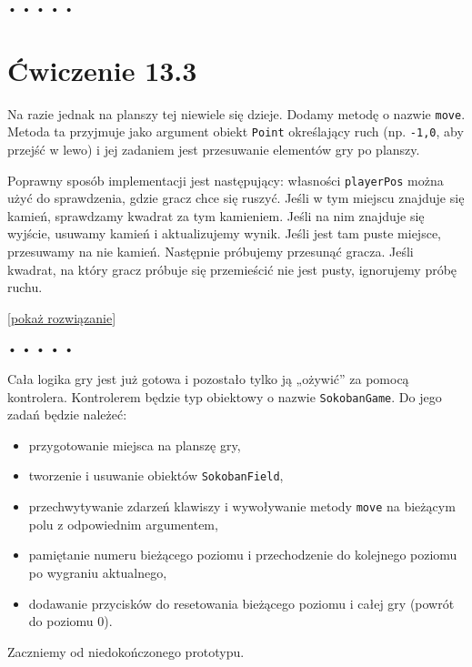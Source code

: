 \begin{center}
• • • • •
\end{center}

  
\section*{Ćwiczenie 13.3}
\label{sec:13.3}
  
    
Na razie jednak na planszy tej niewiele się dzieje. Dodamy metodę o nazwie \texttt{move}. Metoda ta przyjmuje jako argument obiekt \texttt{Point} określający ruch (np. \texttt{-1,0}, aby przejść w lewo) i jej zadaniem jest przesuwanie elementów gry po planszy.

    
Poprawny sposób implementacji jest następujący: własności \texttt{playerPos} można użyć do sprawdzenia, gdzie gracz chce się ruszyć. Jeśli w tym miejscu znajduje się kamień, sprawdzamy kwadrat za tym kamieniem. Jeśli na nim znajduje się wyjście, usuwamy kamień i aktualizujemy wynik. Jeśli jest tam puste miejsce, przesuwamy na nie kamień. Następnie próbujemy przesunąć gracza. Jeśli kwadrat, na który gracz próbuje się przemieścić nie jest pusty, ignorujemy próbę ruchu.

  
[\hyperref[sol:13.3]{pokaż rozwiązanie}]
  


\begin{center}
• • • • •
\end{center}

  
Cała logika gry jest już gotowa i pozostało tylko ją „ożywić” za pomocą kontrolera. Kontrolerem będzie typ obiektowy o nazwie \texttt{SokobanGame}. Do jego zadań będzie należeć:

  \begin{itemize}
    \item przygotowanie miejsca na planszę gry,
    \item tworzenie i usuwanie obiektów \texttt{SokobanField},
    \item przechwytywanie zdarzeń klawiszy i wywoływanie metody \texttt{move} na bieżącym polu z odpowiednim argumentem,
    \item pamiętanie numeru bieżącego poziomu i przechodzenie do kolejnego poziomu po wygraniu aktualnego,
    \item dodawanie przycisków do resetowania bieżącego poziomu i całej gry (powrót do poziomu 0).
  \end{itemize}
  
Zaczniemy od niedokończonego prototypu.

